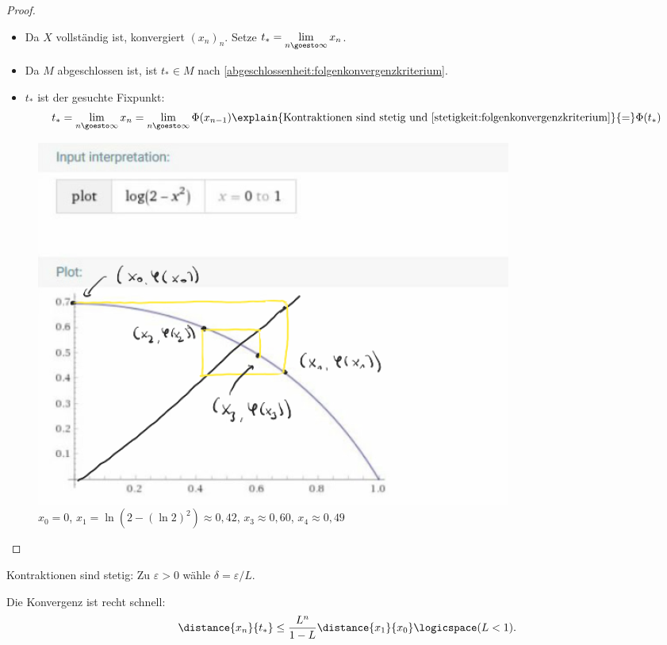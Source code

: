\begin{proof}
\begin{proofdescription}
\begin{subproof}
\begin{itemize}
                \item Da \( X\) vollständig ist, konvergiert \( (x_n)_n\). Setze \( t_*=\lim\limits_{n \goesto \infty} x_n\).
                \item Da \( M\) abgeschlossen ist, ist \( t_*\in M\) nach \ref{abgeschlossenheit:folgenkonvergenzkriterium}.
                \item \( t_*\) ist der gesuchte Fixpunkt:
                \begin{align*}
                    t_*=\lim\limits_{n \goesto \infty} x_n=\lim\limits_{n \goesto \infty} \Phi(x_{n-1})\explain{\text{Kontraktionen sind stetig und \ref{stetigkeit:folgenkonvergenzkriterium}}}{=}\Phi(t_*)
                \end{align*} 
            \end{itemize}
        \begin{figure}[H]
            \centering
            \includegraphics[width=0.6\linewidth]{figures/fixpunktsatz_beweis_existenz}
            \caption*{\( x_0=0\), \( x_1=\ln(2-(\ln 2)^2)\approx 0,42\), \( x_3\approx 0,60\), \( x_4\approx 0,49\)   }
            \label{fig:fixpunktsatz_beweis_existenz}
        \end{figure}
        
        \end{subproof}
        
           
    \end{proofdescription}
    
    
\end{proof}
\begin{bemerkung*}
    Kontraktionen sind stetig: Zu \( \varepsilon>0\) wähle \( \delta=\varepsilon/L\).
\end{bemerkung*}
\begin{bemerkung*}
    Die Konvergenz ist recht schnell:
    \begin{align*}
        \distance{x_n}{t_*}\leq \frac{L^n}{1-L}\distance{x_1}{x_0}\logicspace (L<1).
    \end{align*}
\end{bemerkung*}

